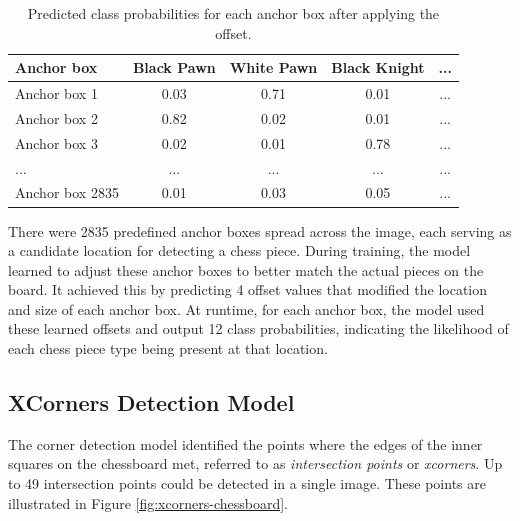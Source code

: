 \begin{table}[h]
    \centering
    \caption[Predicted chess piece after applying offset]{Predicted class probabilities for each anchor box after applying the offset.}  %
    \renewcommand{\arraystretch}{1.3}
    \begin{tabular}{lcccc}
        \toprule
        \textbf{Anchor box} & \textbf{Black Pawn} & \textbf{White Pawn} & \textbf{Black Knight} & \textbf{...} \\
        \midrule
        Anchor box 1 & \raggedright 0.03 & \raggedright 0.71 & \raggedright 0.01 & ... \\
        Anchor box 2 & \raggedright 0.82 & \raggedright 0.02 & \raggedright 0.01 & ... \\
        Anchor box 3 & \raggedright 0.02 & \raggedright 0.01 & \raggedright 0.78 & ... \\
        ... & ... & ... & ... & ... \\
        Anchor box 2835 & \raggedright 0.01 & \raggedright 0.03 & \raggedright 0.05 & ... \\
        \bottomrule
    \end{tabular}
    \label{tab:piece-probability-table}
\end{table}

\newpage

There were 2835 predefined anchor boxes spread across the image, each serving as a candidate location for detecting a chess piece. During training, the model learned to adjust these anchor boxes to better match the actual pieces on the board. It achieved this by predicting 4 offset values that modified the location and size of each anchor box. At runtime, for each anchor box, the model used these learned offsets and output 12 class probabilities, indicating the likelihood of each chess piece type being present at that location.

\subsection{XCorners Detection Model}
The corner detection model identified the points where the edges of the inner squares on the chessboard met, referred to as \textit{intersection points} or \textit{xcorners}. Up to 49 intersection points could be detected in a single image. These points are illustrated in Figure \ref{fig:xcorners-chessboard}.

